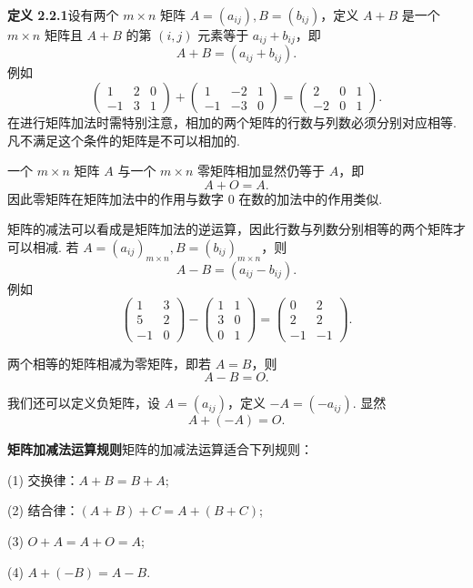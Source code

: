 \documentclass[UTF8, 12pt, fontset=fandol, oneside]{ctexart}
\begin{document}
\noindent\textbf{定义 2.2.1}\quad 设有两个 $m\times n$ 矩阵 $A=(a_{ij}), B=(b_{ij})$，定义 $A+B$ 是一个 $m\times n$ 矩阵且 $A+B$ 的第 $(i,j)$ 元素等于 $a_{ij}+b_{ij}$，即
\[
A+B=(a_{ij}+b_{ij}).
\]
例如
\[
\left(\begin{array}{ccc}
1 & 2 & 0\\
-1 & 3 & 1
\end{array}\right)
+
\left(\begin{array}{ccc}
1 & -2 & 1\\
-1 & -3 & 0
\end{array}\right)
=
\left(\begin{array}{ccc}
2 & 0 & 1\\
-2 & 0 & 1
\end{array}\right).
\]
在进行矩阵加法时需特别注意，相加的两个矩阵的行数与列数必须分别对应相等. 凡不满足这个条件的矩阵是不可以相加的.

一个 $m\times n$ 矩阵 $A$ 与一个 $m\times n$ 零矩阵相加显然仍等于 $A$，即
\[
A+O=A.
\]
因此零矩阵在矩阵加法中的作用与数字 $0$ 在数的加法中的作用类似.

矩阵的减法可以看成是矩阵加法的逆运算，因此行数与列数分别相等的两个矩阵才可以相减. 若 $A=(a_{ij})_{m\times n}, B=(b_{ij})_{m\times n}$，则
\[
A-B=(a_{ij}-b_{ij}).
\]
例如
\[
\left(\begin{array}{cc}
1 & 3\\
5 & 2\\
-1 & 0
\end{array}\right)
-
\left(\begin{array}{cc}
1 & 1\\
3 & 0\\
0 & 1
\end{array}\right)
=
\left(\begin{array}{cc}
0 & 2\\
2 & 2\\
-1 & -1
\end{array}\right).
\]

两个相等的矩阵相减为零矩阵，即若 $A=B$，则
\[
A-B=O.
\]

我们还可以定义负矩阵，设 $A=(a_{ij})$，定义 $-A=(-a_{ij})$. 显然
\[
A+(-A)=O.
\]

\noindent\textbf{矩阵加减法运算规则}\quad 矩阵的加减法运算适合下列规则：

(1) 交换律：$A+B=B+A$;

(2) 结合律：$(A+B)+C=A+(B+C)$;

(3) $O+A=A+O=A$;

(4) $A+(-B)=A-B$.
\end{document}
